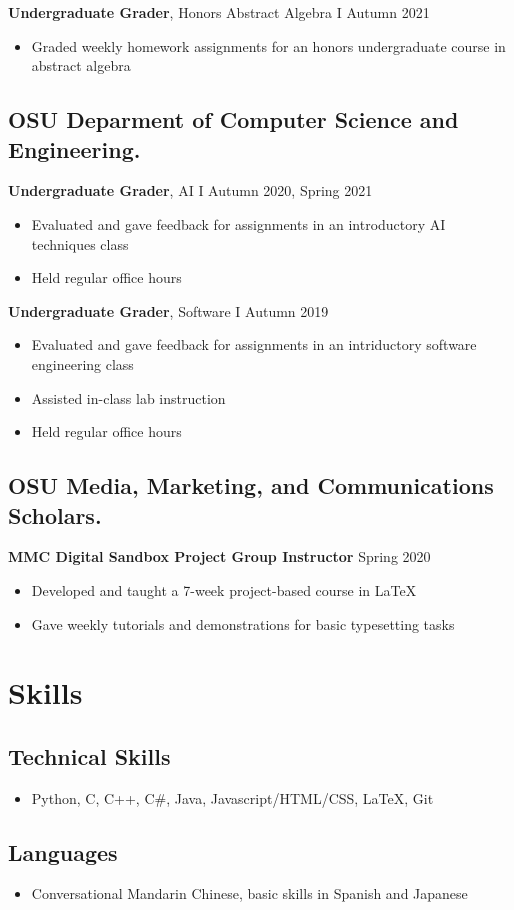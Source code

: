 \documentclass[10pt,sans]{moderncv}
\begin{document}
\textbf{Undergraduate Grader}, Honors Abstract Algebra I
\hfill Autumn 2021
\begin{itemize}
    \item Graded weekly homework assignments for an honors undergraduate course in abstract algebra
\end{itemize}

\subsection*{OSU Deparment of Computer Science and Engineering.}

\textbf{Undergraduate Grader}, AI I
\hfill Autumn 2020, Spring 2021
\begin{itemize}
    \item Evaluated and gave feedback for assignments in an introductory AI techniques class
    \item Held regular office hours
\end{itemize}

\textbf{Undergraduate Grader}, Software I
\hfill Autumn 2019
\begin{itemize}
    \item Evaluated and gave feedback for assignments in an intriductory software engineering class
    \item Assisted in-class lab instruction
    \item Held regular office hours
\end{itemize}

\subsection*{OSU Media, Marketing, and Communications Scholars.}

\textbf{MMC Digital Sandbox Project Group Instructor}
\hfill Spring 2020
\begin{itemize}
    \item Developed and taught a 7-week project-based course in LaTeX
    \item Gave weekly tutorials and demonstrations for basic typesetting tasks
\end{itemize}

\section*{Skills}

\subsection*{Technical Skills}
\begin{itemize}
    \item Python, C, C++, C\#, Java, Javascript/HTML/CSS, LaTeX, Git
\end{itemize}

\subsection*{Languages}
\begin{itemize}
    \item Conversational Mandarin Chinese, basic skills in Spanish and Japanese
\end{itemize}
\end{document}
